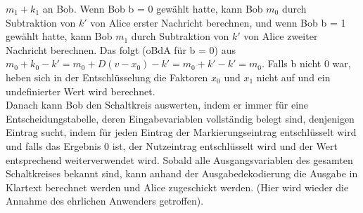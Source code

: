 \documentclass{article}
\begin{document}
\(m_1 + k_1\) an Bob. Wenn Bob b = 0 gew\"ahlt hatte, kann Bob \(m_0\)
durch Subtraktion von \(k'\) von Alice erster Nachricht berechnen, und wenn
Bob b = 1 gew\"ahlt hatte, kann Bob \(m_1\) durch Subtraktion von \(k'\) von
Alice zweiter Nachricht berechnen. Das folgt (oBdA f\"ur b = 0) aus
\(m_0 + k_0 - k' = m_0 + D(v - x_0) - k' = m_0 + k' - k' = m_0\). Falls b 
nicht 0 war, heben sich in der Entschl\"usselung die Faktoren \(x_0\) und
\(x_1\) nicht auf und ein undefinierter Wert wird berechnet. \\
Danach kann Bob den Schaltkreis auswerten, indem er immer f\"ur eine 
Entscheidungstabelle, deren Eingabevariablen vollst\"andig belegt sind,
denjenigen Eintrag sucht, indem f\"ur jeden Eintrag der Markierungseintrag
entschl\"usselt wird und falls das Ergebnis 0 ist, der Nutzeintrag
entschl\"usselt wird und der Wert entsprechend weiterverwendet wird. Sobald
alle Ausgangsvariablen des gesamten Schaltkreises bekannt sind, kann anhand
der Ausgabedekodierung die Ausgabe in Klartext berechnet werden und Alice 
zugeschickt werden. (Hier wird wieder die Annahme des ehrlichen Anwenders
getroffen).
\end{document}
